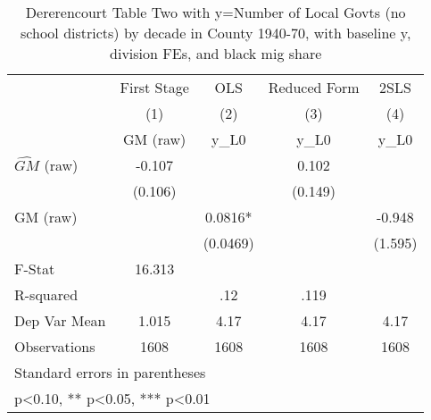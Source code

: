 \begin{table}[htbp]\centering
\def\sym#1{\ifmmode^{#1}\else\(^{#1}\)\fi}
\caption{Dererencourt Table Two with y=Number of Local Govts (no school districts) by decade in County 1940-70, with baseline y, division FEs, and black mig share}
\begin{tabular}{l*{4}{c}}
\toprule
                    & First Stage   &         OLS   &Reduced Form   &        2SLS   \\
                    &\multicolumn{1}{c}{(1)}&\multicolumn{1}{c}{(2)}&\multicolumn{1}{c}{(3)}&\multicolumn{1}{c}{(4)}\\
                    &\multicolumn{1}{c}{GM  (raw)}&\multicolumn{1}{c}{y\_L0}&\multicolumn{1}{c}{y\_L0}&\multicolumn{1}{c}{y\_L0}\\
\midrule
$\hat{GM}$ (raw)    &      -0.107   &               &       0.102   &               \\
                    &     (0.106)   &               &     (0.149)   &               \\
\addlinespace
GM  (raw)           &               &      0.0816*  &               &      -0.948   \\
                    &               &    (0.0469)   &               &     (1.595)   \\
\midrule
F-Stat              &      16.313   &               &               &               \\
R-squared           &               &         .12   &        .119   &               \\
Dep Var Mean        &       1.015   &        4.17   &        4.17   &        4.17   \\
Observations        &        1608   &        1608   &        1608   &        1608   \\
\bottomrule
\multicolumn{5}{l}{\footnotesize Standard errors in parentheses}\\
\multicolumn{5}{l}{\footnotesize * p<0.10, ** p<0.05, *** p<0.01}\\
\end{tabular}
\end{table}

